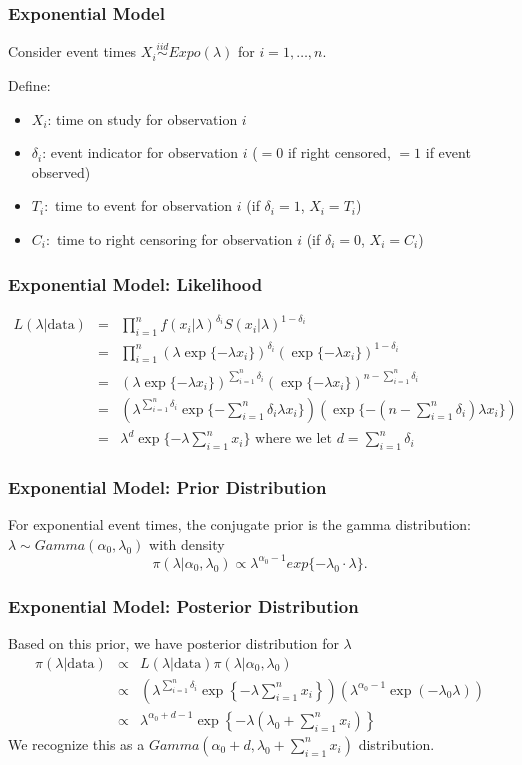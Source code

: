 \documentclass{beamer}
\begin{document}
\begin{frame}
\frametitle{Exponential Model}
Consider event times $X_i \overset{iid}{\sim} Expo(\lambda)$ for $i = 1, \ldots, n$. 

Define:
\begin{itemize}
\item$X_i$: time on study for observation $i$
\item $\delta_i$: event indicator for observation $i$ ($=0$ if right censored, $=1$ if event observed)
\item $T_i:$ time to event for observation $i$ (if $\delta_i = 1$, $X_i = T_i$)
\item $C_i:$ time to right censoring for observation $i$ (if $\delta_i = 0$, $X_i = C_i$)
\end{itemize}
\end{frame}

\begin{frame}
\frametitle{Exponential Model: Likelihood}
\begin{eqnarray*}
L(\lambda|\text{data}) &=& \prod_{i=1}^{n} f(x_i|\lambda)^{\delta_i}S(x_i|\lambda)^{1-\delta_i} \\
&=& \prod_{i=1}^{n} (\lambda \exp\{-\lambda x_i\})^{\delta_i}(\exp\{-\lambda x_i\})^{1-\delta_i} \\
&=& (\lambda \exp\{-\lambda x_i\})^{\sum_{i=1}^{n}\delta_i}(\exp\{-\lambda x_i\})^{n-\sum_{i=1}^{n}\delta_i} \\
&=& (\lambda^{\sum_{i=1}^{n}\delta_i} \exp\{-\sum_{i=1}^{n}\delta_i\lambda x_i\})(\exp\{-(n-\sum_{i=1}^{n}\delta_i)\lambda x_i\}) \\
&=& \lambda^{d}\exp\{-\lambda \sum_{i=1}^{n}x_i\} \text{ where we let }d = \sum_{i=1}^{n}\delta_i
\end{eqnarray*}
\end{frame}

\begin{frame}
\frametitle{Exponential Model: Prior Distribution}
For exponential event times, the conjugate prior is the gamma distribution: $\lambda \sim Gamma(\alpha_0, \lambda_0)$ with density
$$\pi(\lambda|\alpha_0,\lambda_0) \propto \lambda^{\alpha_0-1}exp\{-\lambda_0 \cdot \lambda\}.$$
\end{frame}

\begin{frame}
\frametitle{Exponential Model: Posterior Distribution}
Based on this prior, we have posterior distribution for $\lambda$
\begin{eqnarray*}
\pi(\lambda|\text{data}) &\propto& L(\lambda|\text{data}) \pi(\lambda|\alpha_0,\lambda_0) \\
&\propto& \left(\lambda^{\sum_{i=1}^n \delta_i} \exp\left\{-\lambda \sum_{i=1}^n x_i \right\} \right) \left(\lambda^{\alpha_0-1}\exp(-\lambda_0\lambda) \right) \\
&\propto& \lambda^{\alpha_0+d - 1}\exp\left\{-\lambda(\lambda_0 + \sum_{i=1}^n x_i ) \right\}
\end{eqnarray*}
We recognize this as a \color{orange}$Gamma(\alpha_0 + d, \lambda_0 + \sum_{i=1}^{n}x_i)$ \color{black}distribution. 
\end{frame}
\end{document}
